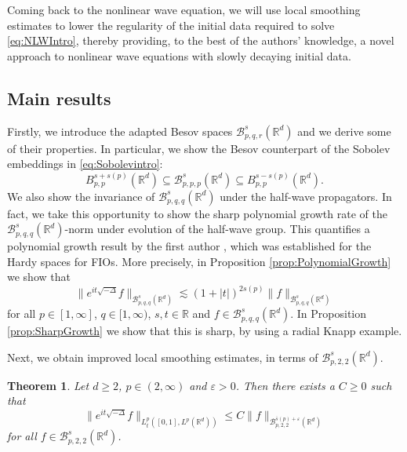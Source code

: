\documentclass{amsart}
\newtheorem{theorem}{Theorem}[section]
\theoremstyle{definition}
\newcommand{\R}{\mathbb{R}}
\newcommand {\Rd}{\mathbb{R}^{d}}
\newcommand {\Ba}{\mathcal{B}}
\newcommand {\Baspqr}{\mathcal{B}^{s}_{p,q,r}(\Rd)}
\newcommand {\Baspqq}{\mathcal{B}^{s}_{p,q,q}(\Rd)}
\newcommand {\Basppp}{\mathcal{B}^{s}_{p,p,p}(\Rd)}
\newcommand {\veps}{\varepsilon}
\numberwithin{equation}{section}
\begin{document}
Coming back to the nonlinear wave equation, we will use local smoothing estimates to lower the regularity of the initial data required to solve  \eqref{eq:NLWIntro}, thereby providing, to the best of the authors' knowledge, a novel approach to nonlinear wave equations with slowly decaying initial data.





\subsection*{Main results}

Firstly, we introduce the adapted Besov spaces $\Baspqr$ and we derive some of their properties. In particular, we show the Besov counterpart of the Sobolev embeddings in \eqref{eq:Sobolevintro}:
\begin{equation}\label{eq:SobolevBesovIntro}
B^{s+s(p)}_{p,p}(\Rd)\subseteq\Basppp\subseteq B^{s-s(p)}_{p,p}(\Rd).
\end{equation}
We also show the invariance of $\Baspqq$ under the half-wave propagators. In fact, we take this opportunity to show the sharp polynomial growth rate of the $\Baspqq$-norm under evolution of the half-wave group. This quantifies a polynomial growth result by the first author \cite[Lemma~3.5]{Rozendaal2021LocalSmoothing}, which was established for the Hardy spaces for FIOs. More precisely, in Proposition \ref{prop:PolynomialGrowth} we show that 
\begin{equation}
\label{eq:PolynomialGrowthIntro}
\| e^{it \sqrt{- \Delta}} f \|_{\mathcal{B}^{s}_{p,q,q}(\R^d)} \lesssim (1+|t|)^{2s(p)} \| f \|_{\mathcal{B}^{s}_{p,q,q}(\R^d)}
\end{equation}
for all $p\in[1,\infty]$, $q\in[1,\infty)$, $s,t\in\R$ and $f\in\Baspqq$. In Proposition \ref{prop:SharpGrowth} we show that this is sharp, by using a radial Knapp example. 

Next, we obtain improved local smoothing estimates, in terms of $\Ba^{s}_{p,2,2}(\Rd)$. 

\begin{theorem}%
\label{thm:LocalSmoothingHardy}
Let $d \geq 2$, $p\in(2,\infty)$ and $\veps>0$. Then there exists a $C\geq0$ such that
\begin{equation}
\label{eq:LocalSmoothingHardySpaces}
\| e^{it \sqrt{- \Delta}} f \|_{L_t^p([0,1],L^p(\R^d))} \leq C \| f \|_{\mathcal{B}^{\overline{s}(p)+\veps}_{p,2,2}(\R^d)}
\end{equation}
for all $f\in\Ba^{s}_{p,2,2}(\Rd)$.
\end{theorem}
\end{document}
